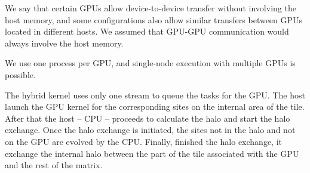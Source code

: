 We say that certain GPUs allow device-to-device transfer without involving the host memory, and some configurations also allow similar transfers between GPUs located in different hosts. We assumed that GPU-GPU communication would always involve the host memory.

We use one process per GPU, and single-node execution with multiple GPUs is possible.

The hybrid kernel uses only one stream to queue the tasks for the GPU. The host launch the GPU kernel for the corresponding sites on the internal area of the tile. After that the host -- CPU -- proceeds to calculate the halo and start the halo exchange. Once the halo exchange is initiated, the sites not in the halo and not on the GPU are evolved by the CPU. Finally, finished the halo exchange, it exchange the internal halo between the part of the tile associated with the GPU and the rest of the matrix.